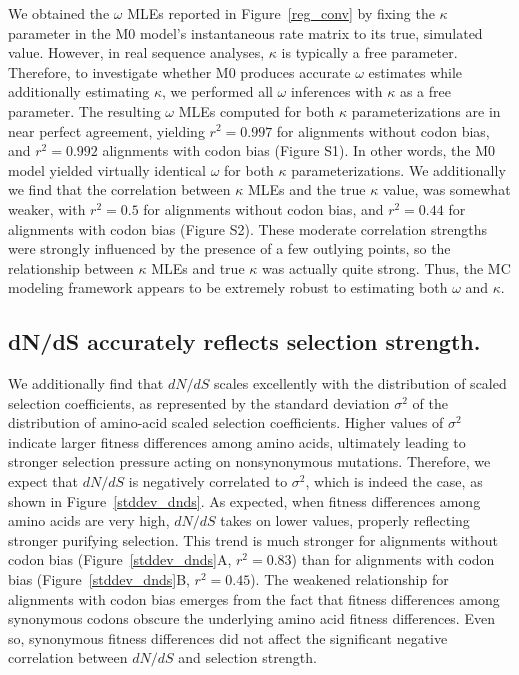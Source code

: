 \documentclass{pnastwo}
\begin{document}
\begin{article}
We obtained the $\omega$ MLEs reported in Figure~\ref{reg_conv} by fixing the $\kappa$ parameter in the M0 model's instantaneous rate matrix to its true, simulated value. However, in real sequence analyses, $\kappa$ is typically a free parameter. Therefore, to investigate whether M0 produces accurate $\omega$ estimates while additionally estimating $\kappa$, we performed all $\omega$ inferences with $\kappa$ as a free parameter. The resulting $\omega$ MLEs computed for both $\kappa$ parameterizations are in near perfect agreement, yielding $r^2=0.997$ for alignments without codon bias, and $r^2=0.992$ alignments with codon bias (Figure S1). In other words, the M0 model yielded virtually identical $\omega$ for both $\kappa$ parameterizations. We additionally we find that the correlation between $\kappa$ MLEs and the true $\kappa$ value, was somewhat weaker, with $r^2=0.5$ for alignments without codon bias, and $r^2=0.44$ for alignments with codon bias (Figure S2). These moderate correlation strengths were strongly influenced by the presence of a few outlying points, so the relationship between $\kappa$ MLEs and true $\kappa$ was actually quite strong. Thus, the MC modeling framework appears to be extremely robust to estimating both $\omega$ and $\kappa$.  

\subsection*{dN/dS accurately reflects selection strength.}

We additionally find that $dN/dS$ scales excellently with the distribution of scaled selection coefficients, as represented by the standard deviation $\sigma^2$ of the distribution of amino-acid scaled selection coefficients. Higher values of $\sigma^2$ indicate larger fitness differences among amino acids, ultimately leading to stronger selection pressure acting on nonsynonymous mutations. Therefore, we expect that $dN/dS$ is negatively correlated to $\sigma^2$, which is indeed the case, as shown in Figure~\ref{stddev_dnds}. As expected, when fitness differences among amino acids are very high, $dN/dS$ takes on lower values, properly reflecting stronger purifying selection. This trend is much stronger for alignments without codon bias (Figure~\ref{stddev_dnds}A, $r^2 = 0.83$) than for alignments with codon bias (Figure~\ref{stddev_dnds}B, $r^2 = 0.45$). The weakened relationship for alignments with codon bias emerges from the fact that fitness differences among synonymous codons obscure the underlying amino acid fitness differences. Even so, synonymous fitness differences did not affect the significant negative correlation between $dN/dS$ and selection strength.


\end{article}
\end{document}
